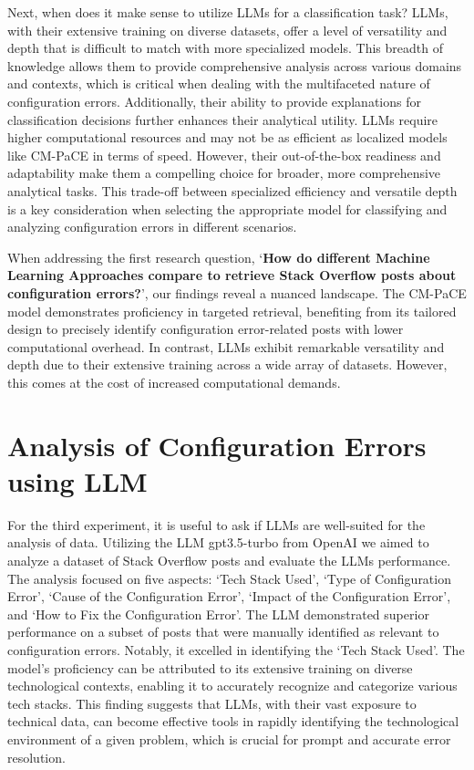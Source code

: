 \documentclass[english,bachelor]{swsLeipzig}
\begin{document}
Next, when does it make sense to utilize LLMs for a classification task? LLMs, with their extensive training on diverse datasets, offer a level of 
versatility and depth that is difficult to match with more specialized models. This breadth of knowledge allows them to provide comprehensive analysis across various domains and contexts, which is critical when dealing with the multifaceted nature of configuration errors. Additionally, their ability to provide explanations for classification decisions further enhances their analytical utility. LLMs require higher computational resources and may not be as efficient as localized models like CM-PaCE in terms of speed. However, their out-of-the-box readiness and adaptability make them a compelling choice for broader, more comprehensive analytical tasks. This trade-off between specialized efficiency and versatile depth is a key consideration when selecting the appropriate model for classifying and analyzing configuration errors in different scenarios.

When addressing the first research question, `\textbf{How do different Machine 
Learning Approaches compare to retrieve Stack Overflow posts about configuration errors?}', our findings reveal a nuanced landscape. The CM-PaCE model demonstrates proficiency in targeted retrieval, benefiting from its tailored design to precisely identify configuration error-related posts with lower computational overhead. In contrast, LLMs exhibit remarkable versatility and depth due to their extensive training across a wide array of datasets. However, this comes at the cost of increased computational demands.

\section{Analysis of Configuration Errors using LLM}

For the third experiment, it is useful to ask if LLMs are well-suited for the analysis of data. Utilizing the LLM gpt3.5-turbo from OpenAI we aimed to analyze a dataset of Stack Overflow 
posts and evaluate the LLMs performance. The analysis focused on five aspects: `Tech Stack Used', `Type of Configuration Error', `Cause of the Configuration Error', `Impact of the Configuration Error', and `How to Fix the Configuration Error'. The LLM demonstrated superior performance on a subset of posts that were manually identified as relevant to configuration errors. Notably, it excelled in identifying the `Tech Stack Used'. The model's proficiency can be attributed to its extensive training on diverse technological contexts, enabling it to accurately recognize and categorize various tech stacks. This finding suggests that LLMs, with their vast exposure to technical data, can become effective tools in rapidly identifying the technological environment of a given problem, which is crucial for prompt and accurate error resolution.
\end{document}
